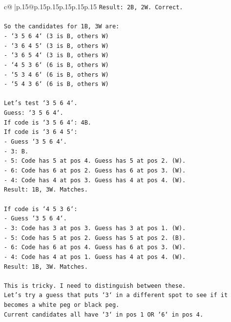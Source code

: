 \documentclass{article}
\begin{document}
{\begin{supertabular}{c@{$\;$}|p{.15\linewidth}@{}p{.15\linewidth}p{.15\linewidth}p{.15\linewidth}p{.15\linewidth}p{.15\linewidth}}
{{{\texttt{Result: 2B, 2W. Correct.} \\
\\ 
\texttt{So the candidates for 1B, 3W are:} \\
\texttt{{-} `3 5 6 4` (3 is B, others W)} \\
\texttt{{-} `3 6 4 5` (3 is B, others W)} \\
\texttt{{-} `3 6 5 4` (3 is B, others W)} \\
\texttt{{-} `4 5 3 6` (6 is B, others W)} \\
\texttt{{-} `5 3 4 6` (6 is B, others W)} \\
\texttt{{-} `5 4 3 6` (6 is B, others W)} \\
\\ 
\texttt{Let's test `3 5 6 4`.} \\
\texttt{Guess: `3 5 6 4`.} \\
\texttt{If code is `3 5 6 4`: 4B.} \\
\texttt{If code is `3 6 4 5`:} \\
\texttt{{-} Guess `3 5 6 4`.} \\
\texttt{{-} 3: B.} \\
\texttt{{-} 5: Code has 5 at pos 4. Guess has 5 at pos 2. (W).} \\
\texttt{{-} 6: Code has 6 at pos 2. Guess has 6 at pos 3. (W).} \\
\texttt{{-} 4: Code has 4 at pos 3. Guess has 4 at pos 4. (W).} \\
\texttt{Result: 1B, 3W. Matches.} \\
\\ 
\texttt{If code is `4 5 3 6`:} \\
\texttt{{-} Guess `3 5 6 4`.} \\
\texttt{{-} 3: Code has 3 at pos 3. Guess has 3 at pos 1. (W).} \\
\texttt{{-} 5: Code has 5 at pos 2. Guess has 5 at pos 2. (B).} \\
\texttt{{-} 6: Code has 6 at pos 4. Guess has 6 at pos 3. (W).} \\
\texttt{{-} 4: Code has 4 at pos 1. Guess has 4 at pos 4. (W).} \\
\texttt{Result: 1B, 3W. Matches.} \\
\\ 
\texttt{This is tricky. I need to distinguish between these.} \\
\texttt{Let's try a guess that puts `3` in a different spot to see if it becomes a white peg or black peg.} \\
\texttt{Current candidates all have `3` in pos 1 OR `6` in pos 4.} \\
}}}
\end{supertabular}}
\end{document}
